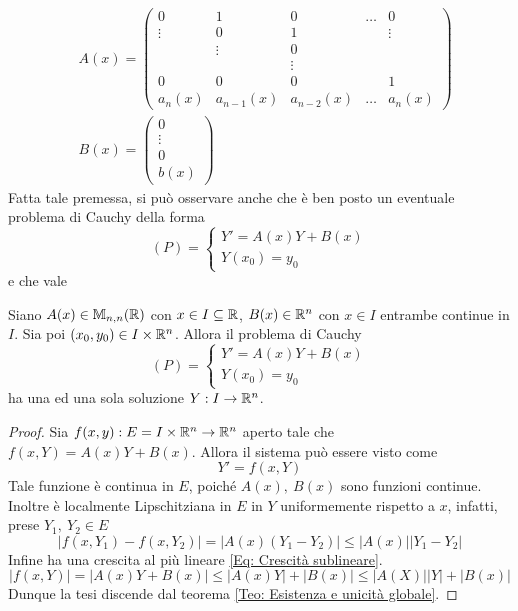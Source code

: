 \begin{align}
&A(x)=\begin{pmatrix}
    0 & 1 & 0 & \dots &  0\\
    \vdots & 0 & 1 & \,  &\vdots\\
    \, & \vdots & 0 & \,  &\,\\
    \, & \, & \vdots & \,  &\,\\
    0 & 0 & 0 & \,  & 1\\
    a_n(x) & a_{n-1}(x) & a_{n-2}(x) & \dots & a_n(x)
\end{pmatrix}\\
&B(x)= \begin{pmatrix}
    0\\
    \vdots\\
    0\\
    b(x)
\end{pmatrix}
\end{align}
Fatta tale premessa, si può osservare anche che è ben posto un eventuale problema di Cauchy della forma
\begin{equation*}
    (P)=\begin{cases}
        Y'=A(x)Y+B(x)\\
        Y(x_0)=y_0
    \end{cases}
\end{equation*}
e che vale
\begin{theorem}
    Siano $A(x) \in \mathbb{M}_{n,n}(\mathbb{R})$ con $x \in I \subseteq \mathbb{R}$, $B(x) \in \mathbb{R}^n$ con $x \in I$ entrambe continue in $I$. Sia poi $(x_0, y_0) \in I \times \mathbb{R}^n$. Allora il problema di Cauchy
    \begin{equation*}
    (P)=\begin{cases}
        Y'=A(x)Y+B(x)\\
        Y(x_0)=y_0
    \end{cases}
    \end{equation*}
    ha una ed una sola soluzione $Y: I \to \mathbb{R}^n$.
\end{theorem}
\begin{proof}
    Sia $f(x,y): E=I \times \mathbb{R}^n \to \mathbb{R}^n$ aperto tale che $f(x,Y)=A(x)Y+B(x)$. Allora il sistema può essere visto come 
    \begin{equation*}
        Y'=f(x, Y)
    \end{equation*}
    Tale funzione è continua in $E$, poiché $A(x),\ B(x)$ sono funzioni continue.
    Inoltre è localmente Lipschitziana in $E$ in $Y$ uniformemente rispetto a $x$, infatti, prese $Y_1,\ Y_2 \in E$
    \begin{equation*}
    |f(x, Y_1)- f(x, Y_2)|=|A(x)(Y_1-Y_2)|\leq |A(x)||Y_1-Y_2|
    \end{equation*}
    Infine ha una crescita al più lineare \eqref{Eq: Crescità sublineare}. 
    \begin{equation*}
        |f(x, Y)|=|A(x)Y+B(x)| \leq |A(x)Y|+|B(x)| \leq |A(X)||Y|+|B(x)|
    \end{equation*}
    Dunque la tesi discende dal teorema \ref{Teo: Esistenza e unicità globale}.
\end{proof}
